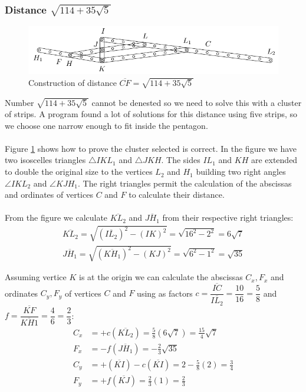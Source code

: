\documentclass[11pt]{article}
\begin{document}
\subsubsection{Distance $\sqrt{114+35\sqrt5}$}

\begin{figure}[h]
 \centering
 \includegraphics[scale=1.3]{10/cluster10a}
 \caption{Construction of distance $\overline{CF} = \sqrt{114+35\sqrt5}$}
 \label{fig:cluster10a}
\end{figure}

Number $\sqrt{114 + 35\sqrt5}$ cannot be denested so we need to solve this with a cluster of strips. A program found a lot of solutions for this distance using five strips, so we choose one narrow enough to fit inside the pentagon.
\\\\
Figure \ref{fig:cluster10a} shows how to prove the cluster selected is correct. In the figure we have two isoscelles triangles $\triangle{IKL_1}$ and $\triangle{JKH}$. The sides $IL_1$ and $KH$ are extended to double the original size to the vertices $L_2$ and $H_1$ building two right angles $\angle{IKL_2}$ and $\angle{KJH_1}$. The right triangles permit the calculation of the abscissas and ordinates of vertices $C$ and $F$ to calculate their distance.
\\\\
From the figure we calculate $\overline{KL_2}$ and $\overline{JH_1}$ from their respective right triangles:
\begin{align}
\overline{KL_2} = \sqrt{(\overline{IL_2})^2 - (IK)^2} = \sqrt{16^2 - 2^2} = 6\sqrt7\\
\overline{JH_1} = \sqrt{(\overline{KH_1})^2 - (KJ)^2} = \sqrt{6^2 - 1^2} = \sqrt{35}
\end{align}

Assuming vertice $K$ is at the origin we can calculate the abscissas $C_x,F_x$ and ordinates $C_y,F_y$ of vertices $C$ and $F$ using as factors $c = \dfrac{\overline{IC}}{\overline{IL_2}} = \dfrac{10}{16} = \dfrac{5}8$ and $f = \dfrac{\overline{KF}}{\overline{KH1}}=\dfrac{4}6 = \dfrac{2}3$:
\begin{align}
C_x &= +c(\overline{KL_2}) = \frac{5}{8}(6\sqrt7) = \frac{15}{4}\sqrt7\\
F_x &= -f(\overline{JH_1}) = -\frac{2}{3}\sqrt{35}\\
C_y &= +(\overline{KI}) - c(\overline{KI}) = 2 - \frac{5}{8}(2) = \frac{3}4\\
F_y &= +f(\overline{KJ}) = \frac{2}{3}(1) = \frac{2}3
\end{align}
\end{document}

